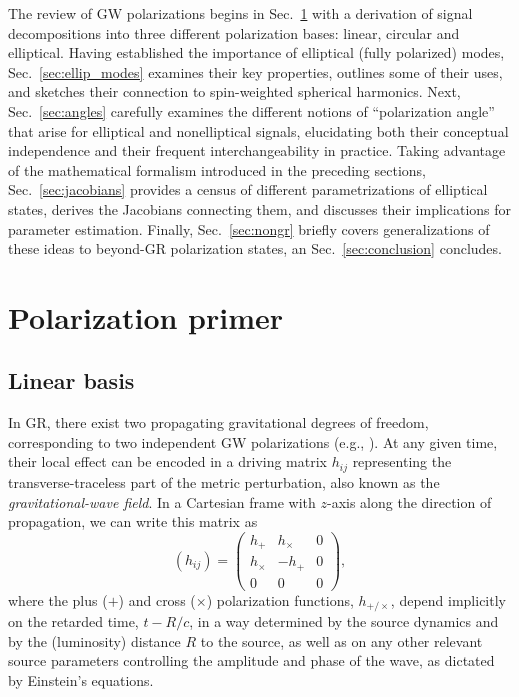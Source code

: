 \documentclass[aps,prd,twocolumn,superscriptaddress,preprintnumbers,floatfix,nofootinbib]{revtex4-2}
\newcommand{\beq}{\begin{equation}}
\newcommand{\eeq}{\end{equation}}
\begin{document}
The review of GW polarizations begins in Sec.~\ref{sec:primer} with a derivation of signal decompositions into three different polarization bases: linear, circular and elliptical.
Having established the importance of elliptical (fully polarized) modes, Sec.~\ref{sec:ellip_modes} examines their key properties, outlines some of their uses, and sketches their connection to spin-weighted spherical harmonics.
Next, Sec.~\ref{sec:angles} carefully examines the different notions of ``polarization angle'' that arise for elliptical and nonelliptical signals, elucidating both their conceptual independence and their frequent interchangeability in practice. 
Taking advantage of the mathematical formalism introduced in the preceding sections, Sec.~\ref{sec:jacobians} provides a census of different parametrizations of elliptical states, derives the Jacobians connecting them, and discusses their implications for parameter estimation.
Finally, Sec.~\ref{sec:nongr} briefly covers generalizations of these ideas to beyond-GR polarization states, an Sec.~\ref{sec:conclusion} concludes.


\section{Polarization primer}
\label{sec:primer}

\subsection{Linear basis}
\label{sec:linear}

In GR, there exist two propagating gravitational degrees of freedom, corresponding to two independent GW polarizations (e.g., \cite{Thorne1983,Thorne:1987af,Poisson2014,BT}).
At any given time, their local effect can be encoded in a driving matrix $h_{ij}$ representing the transverse-traceless part of the metric perturbation, also known as the \emph{gravitational-wave field}.
In a Cartesian frame with $z$-axis along the direction of propagation, we can write this matrix as
\beq \label{eq:hij}
(h_{ij}) = \begin{pmatrix}
h_+ & h_\times  & 0 \\
h_\times  & - h_+ & 0  \\
0 & 0 & 0
\end{pmatrix} ,
\eeq
where the plus ($+$) and cross ($\times$) polarization functions, $h_{+/\times}$, depend implicitly on the retarded time, $t - R/c$, in a way determined by the source dynamics and by the (luminosity) distance $R$ to the source, as well as on any other relevant source parameters controlling the amplitude and phase of the wave, as dictated by Einstein's equations.
\end{document}
